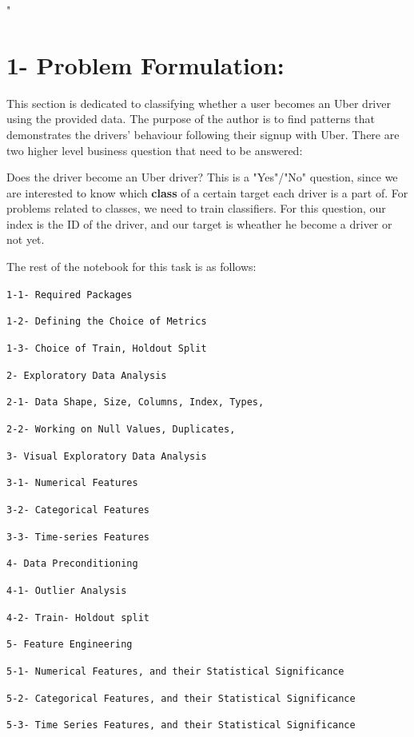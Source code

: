\documentclass[11pt]{article}
\begin{document}
"

    \section{1- Problem Formulation:}\label{problem-formulation}

This section is dedicated to classifying whether a user becomes an Uber
driver using the provided data. The purpose of the author is to find
patterns that demonstrates the drivers' behaviour following their signup
with Uber. There are two higher level business question that need to be
answered:

Does the driver become an Uber driver? This is a "Yes"/"No" question,
since we are interested to know which \textbf{class} of a certain target
each driver is a part of. For problems related to classes, we need to
train classifiers. For this question, our index is the ID of the driver,
and our target is wheather he become a driver or not yet.

The rest of the notebook for this task is as follows:

\texttt{1-1-\ Required\ Packages}

\texttt{1-2-\ Defining\ the\ Choice\ of\ Metrics}

\texttt{1-3-\ Choice\ of\ Train,\ Holdout\ Split}

\texttt{2-\ Exploratory\ Data\ Analysis}

\texttt{2-1-\ Data\ Shape,\ Size,\ Columns,\ Index,\ Types,}

\texttt{2-2-\ Working\ on\ Null\ Values,\ Duplicates,}

\texttt{3-\ Visual\ Exploratory\ Data\ Analysis}

\texttt{3-1-\ Numerical\ Features}

\texttt{3-2-\ Categorical\ Features}

\texttt{3-3-\ Time-series\ Features}

\texttt{4-\ Data\ Preconditioning}

\texttt{4-1-\ Outlier\ Analysis}

\texttt{4-2-\ Train-\ Holdout\ split}

\texttt{5-\ Feature\ Engineering}

\texttt{5-1-\ Numerical\ Features,\ and\ their\ Statistical\ Significance}

\texttt{5-2-\ Categorical\ Features,\ and\ their\ Statistical\ Significance}

\texttt{5-3-\ Time\ Series\ Features,\ and\ their\ Statistical\ Significance}
\end{document}
